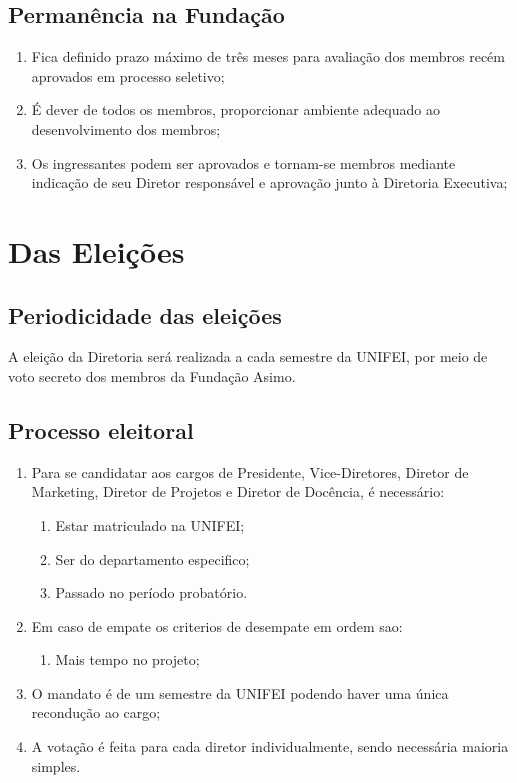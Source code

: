     \section{Permanência na Fundação}
    \begin{enumerate}
        \item Fica definido prazo máximo de três meses para avaliação dos membros recém aprovados em processo seletivo;
        \item É dever de todos os membros, proporcionar ambiente adequado ao desenvolvimento dos membros;
        \item Os ingressantes podem ser aprovados e tornam-se membros mediante indicação de seu Diretor responsável e aprovação junto à Diretoria Executiva;    
    \end{enumerate}
 
\chapter{Das Eleições}
    \section{Periodicidade das eleições}
    A eleição da Diretoria será realizada a cada semestre da UNIFEI, por meio de voto secreto dos membros da Fundação Asimo.
    \section{Processo eleitoral}
    \begin{enumerate}
        \item Para se candidatar aos cargos de Presidente, Vice-Diretores, Diretor de Marketing, Diretor de Projetos e Diretor de Docência, é necessário:
        \begin{enumerate}
            \item Estar matriculado na UNIFEI;
            \item Ser do departamento especifico;
            \item Passado no período probatório.
        \end{enumerate}
        \item Em caso de empate os criterios de desempate em ordem sao:
        \begin{enumerate}
            \item Mais tempo no projeto;
        \end{enumerate}
        \item O mandato é de um semestre da UNIFEI podendo haver uma única recondução ao cargo;
        \item A votação é feita para cada diretor individualmente, sendo necessária maioria simples.
    \end{enumerate}
 
